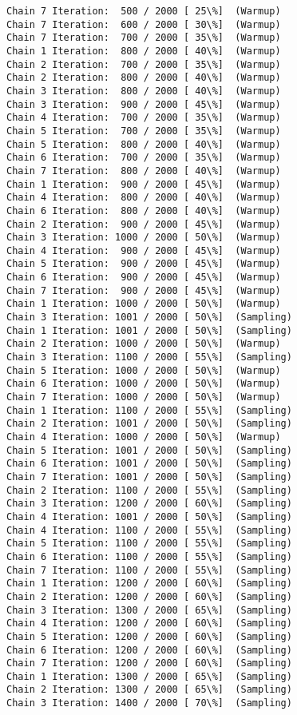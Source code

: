 \documentclass[11pt]{article}
\begin{document}
\begin{Verbatim}[commandchars=\\\{\}]
Chain 7 Iteration:  500 / 2000 [ 25\%]  (Warmup)
Chain 7 Iteration:  600 / 2000 [ 30\%]  (Warmup)
Chain 7 Iteration:  700 / 2000 [ 35\%]  (Warmup)
Chain 1 Iteration:  800 / 2000 [ 40\%]  (Warmup)
Chain 2 Iteration:  700 / 2000 [ 35\%]  (Warmup)
Chain 2 Iteration:  800 / 2000 [ 40\%]  (Warmup)
Chain 3 Iteration:  800 / 2000 [ 40\%]  (Warmup)
Chain 3 Iteration:  900 / 2000 [ 45\%]  (Warmup)
Chain 4 Iteration:  700 / 2000 [ 35\%]  (Warmup)
Chain 5 Iteration:  700 / 2000 [ 35\%]  (Warmup)
Chain 5 Iteration:  800 / 2000 [ 40\%]  (Warmup)
Chain 6 Iteration:  700 / 2000 [ 35\%]  (Warmup)
Chain 7 Iteration:  800 / 2000 [ 40\%]  (Warmup)
Chain 1 Iteration:  900 / 2000 [ 45\%]  (Warmup)
Chain 4 Iteration:  800 / 2000 [ 40\%]  (Warmup)
Chain 6 Iteration:  800 / 2000 [ 40\%]  (Warmup)
Chain 2 Iteration:  900 / 2000 [ 45\%]  (Warmup)
Chain 3 Iteration: 1000 / 2000 [ 50\%]  (Warmup)
Chain 4 Iteration:  900 / 2000 [ 45\%]  (Warmup)
Chain 5 Iteration:  900 / 2000 [ 45\%]  (Warmup)
Chain 6 Iteration:  900 / 2000 [ 45\%]  (Warmup)
Chain 7 Iteration:  900 / 2000 [ 45\%]  (Warmup)
Chain 1 Iteration: 1000 / 2000 [ 50\%]  (Warmup)
Chain 3 Iteration: 1001 / 2000 [ 50\%]  (Sampling)
Chain 1 Iteration: 1001 / 2000 [ 50\%]  (Sampling)
Chain 2 Iteration: 1000 / 2000 [ 50\%]  (Warmup)
Chain 3 Iteration: 1100 / 2000 [ 55\%]  (Sampling)
Chain 5 Iteration: 1000 / 2000 [ 50\%]  (Warmup)
Chain 6 Iteration: 1000 / 2000 [ 50\%]  (Warmup)
Chain 7 Iteration: 1000 / 2000 [ 50\%]  (Warmup)
Chain 1 Iteration: 1100 / 2000 [ 55\%]  (Sampling)
Chain 2 Iteration: 1001 / 2000 [ 50\%]  (Sampling)
Chain 4 Iteration: 1000 / 2000 [ 50\%]  (Warmup)
Chain 5 Iteration: 1001 / 2000 [ 50\%]  (Sampling)
Chain 6 Iteration: 1001 / 2000 [ 50\%]  (Sampling)
Chain 7 Iteration: 1001 / 2000 [ 50\%]  (Sampling)
Chain 2 Iteration: 1100 / 2000 [ 55\%]  (Sampling)
Chain 3 Iteration: 1200 / 2000 [ 60\%]  (Sampling)
Chain 4 Iteration: 1001 / 2000 [ 50\%]  (Sampling)
Chain 4 Iteration: 1100 / 2000 [ 55\%]  (Sampling)
Chain 5 Iteration: 1100 / 2000 [ 55\%]  (Sampling)
Chain 6 Iteration: 1100 / 2000 [ 55\%]  (Sampling)
Chain 7 Iteration: 1100 / 2000 [ 55\%]  (Sampling)
Chain 1 Iteration: 1200 / 2000 [ 60\%]  (Sampling)
Chain 2 Iteration: 1200 / 2000 [ 60\%]  (Sampling)
Chain 3 Iteration: 1300 / 2000 [ 65\%]  (Sampling)
Chain 4 Iteration: 1200 / 2000 [ 60\%]  (Sampling)
Chain 5 Iteration: 1200 / 2000 [ 60\%]  (Sampling)
Chain 6 Iteration: 1200 / 2000 [ 60\%]  (Sampling)
Chain 7 Iteration: 1200 / 2000 [ 60\%]  (Sampling)
Chain 1 Iteration: 1300 / 2000 [ 65\%]  (Sampling)
Chain 2 Iteration: 1300 / 2000 [ 65\%]  (Sampling)
Chain 3 Iteration: 1400 / 2000 [ 70\%]  (Sampling)

\end{Verbatim}
\end{document}
